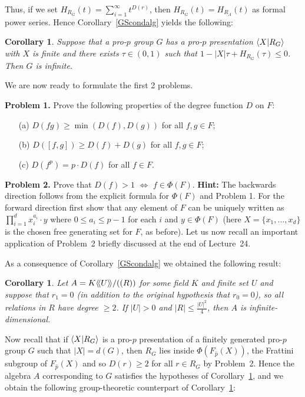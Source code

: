 \documentclass[12pt]{amsart}
\newtheorem {Corollary} [Theorem]   {Corollary}
\begin{document}
Thus, if we set $H_{R_G}(t)=\sum_{i=1}^{\infty}t^{D(r)}$, then $H_{R_G}(t)=H_{R_A}(t)$
as formal power series. Hence Corollary~\ref{GScondalg} yields
the following:

\begin{Corollary} 
\label{GScondgrp}
Suppose that a pro-$p$ group $G$ has a pro-$p$ presentation ${\langle} X|R_G{\rangle}$ with $X$
is finite and there exists $\tau\in (0,1)$ such that $1-|X|\tau+H_{R_G}(\tau)\leq 0$. Then $G$ is infinite.
\end{Corollary}

We are now ready to formulate the first 2 problems.

\skv
\noindent
{\bf Problem 1.} Prove the following properties of the degree function $D$ on $F$:
\begin{itemize}
\item[(a)] $D(fg)\geq \min(D(f),D(g))$ for all $f,g\in F$;
\item[(b)] $D([f,g])\geq D(f)+D(g)$ for all $f,g\in F$;
\item[(c)] $D(f^p)=p\cdot D(f)$ for all $f\in F$.
\end{itemize}

\skv
\noindent
{\bf Problem 2.} Prove that $D(f)>1$ $\iff$ $f\in \Phi(F)$. {\bf Hint:} The backwards direction
follows from the explicit formula for $\Phi(F)$ and Problem 1. For the forward direction first show that any element of $F$ can be uniquely written
as $\prod_{i=1}^d x_i^{a_i} \cdot y$ where $0\leq a_i\leq p-1$ for each $i$ and
$y\in\Phi(F)$ (here $X=\{x_1,\ldots, x_d\}$ is the chosen free generating set for
$F$, as before).
\skv
Let us now recall an important application of Problem~2 briefly discussed at the end of Lecture~24.

As a consequence of Corollary~\ref{GScondalg} we obtained the following result:

\begin{Corollary} 
\label{GScondalg2}
Let $A=K {\langle}\!{\langle} U{\rangle}\!{\rangle}/((R))$ for some field $K$ and finite set $U$ and suppose that
$r_1=0$ (in addition to the original hypothesis that $r_0=0$), so all relations
in $R$ have degree $\geq 2$. If $|U|>0$ and $|R|\leq \frac{|U|^2}{4}$, then $A$ is infinite-dimensional.
\end{Corollary}

Now recall that if ${\langle} X|R_G{\rangle}$ is a pro-$p$ presentation of a finitely generated pro-$p$ group $G$ such that $|X|=d(G)$, then $R_G$ lies inside  $\Phi(F_{\widehat p}(X))$, the Frattini subgroup of $F_{\widehat p}(X)$ and so $D(r)\geq 2$ for all $r\in R_G$ by Problem~2. Hence the algebra $A$ corresponding to $G$ satisfies the hypotheses of Corollary~\ref{GScondalg2}, and we obtain
the following group-theoretic counterpart of Corollary~\ref{GScondalg2}:
\end{document}
